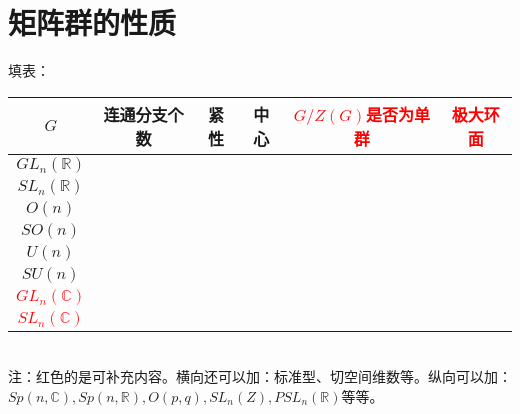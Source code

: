\documentclass{ctexart}
\numberwithin{equation}{section}
\theoremstyle{plain}
\theoremstyle{plain}
\numberwithin{equation}{section}
\theoremstyle{remark}
\begin{document}
\section{矩阵群的性质}
填表：\\[1cm]
\begin{tabular}{|c|c|c|c|c|c|}
	\hline 
$G$	& 连通分支个数 & 紧性 & 中心 & \textcolor{red}{$G/Z(G)$是否为单群} & \textcolor{red}{极大环面}\\ 
	\hline 
$GL_n(\mathbb{R})$	&  &  &  & & \\ 
	\hline 
$SL_n(\mathbb{R})$	&  &  &  & & \\ 
	\hline 
$O(n)$	&  &  &  &  &\\ 
	\hline 
$SO(n)$	&  &  &  &  &\\ 
	\hline 
$U(n)$	&  &  &  &  &\\ 
	\hline 
$SU(n)$	&  &  &  &  &\\ 
	\hline 
\textcolor{red}{$GL_n(\mathbb{C})$}	&  &  &  &  &\\ 
\hline 
\textcolor{red}{$SL_n(\mathbb{C})$}	&  &  &  &  &\\ 
\hline 
\end{tabular} 
\\[1cm]
注：红色的是可补充内容。横向还可以加：标准型、切空间维数等。纵向可以加：$Sp(n,\mathbb{C}),Sp(n,\mathbb{R}),O(p,q),SL_n(Z),PSL_n(\mathbb{R})$等等。




             






 
   



 









 


  

\end{document}
